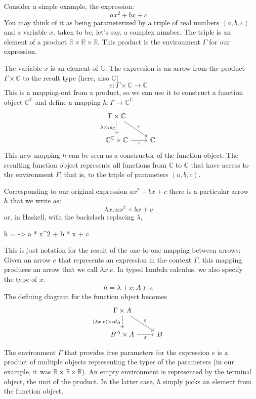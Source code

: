 \documentclass[DaoFP]{subfiles}
\begin{document}
Consider a simple example, the expression:
\[a x^2 + b x + c\]
You may think of it as being parameterized by a triple of real numbers $(a, b, c)$ and a variable $x$, taken to be, let's say, a complex number. The triple is an element of a product $\mathbb{R} \times \mathbb{R} \times \mathbb{R}$. This product is the environment $\Gamma$ for our expression. 

The variable $x$ is an element of $\mathbb{C}$. The expression is an arrow from the product $\Gamma \times \mathbb{C}$ to the result type (here, also $\mathbb{C}$)
\[e \colon \Gamma \times \mathbb{C} \to \mathbb{C} \]
This is a mapping-out from a product, so we can use it to construct a function object  $\mathbb{C}^{\mathbb{C}}$ and define a mapping $h \colon \Gamma \to \mathbb{C}^{\mathbb{C}}$
\[
 \begin{tikzcd}
 \Gamma \times \mathbb{C}
 \arrow[d, dashed, "h \times id_{\mathbb{C}}"']
 \arrow[rd, "e"]
 \\
 \mathbb{C}^{\mathbb{C}} \times \mathbb{C}
 \arrow[r, "\varepsilon"']
& \mathbb{C}
 \end{tikzcd}
\]
This new mapping $h$ can be seen as a constructor of the function object. The resulting function object represents all functions from $\mathbb{C}$ to $\mathbb{C}$ that have access to the environment $\Gamma$; that is, to the triple of parameters $(a, b, c)$. 

Corresponding to our original expression $a x^2 + b x + c$ there is a particular arrow $h$ that we write as:
\[ \lambda x . \,a x^2 + b x + c \]
or, in Haskell, with the backslash replacing $\lambda$,
\begin{haskell}
h = \x -> a * x^2 + b * x + c
\end{haskell}

This is just notation for the result of the one-to-one mapping between arrows: Given an arrow $e$ that represents an expression in the context $\Gamma$, this mapping produces an arrow that we call $\lambda x . e$. In typed lambda calculus, we also specify the type of $x$:
\[h = \lambda\;  (x \colon A) . \, e\]
The defining diagram for the function object becomes
\[
 \begin{tikzcd}
 \Gamma \times A
 \arrow[d, dashed, "{(\lambda x  . e) \times id_A}"']
 \arrow[rd, "e"]
 \\
 B^A \times A
 \arrow[r, "\varepsilon"']
& B
 \end{tikzcd}
\]

The environment $\Gamma$ that provides free parameters for the expression $e$ is a product of multiple objects representing the types of the parameters (in our example, it was $\mathbb{R} \times \mathbb{R} \times \mathbb{R}$). An empty environment is represented by the terminal object, the unit of the product. In the latter case, $h$ simply picks an element from the function object. 
\end{document}
